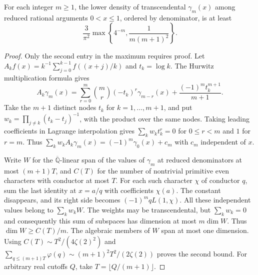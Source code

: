 \documentclass[11pt,a4paper]{article}
\theoremstyle{definition}\newtheorem{definition}[theorem]{Definition}\newtheorem{example}[theorem]{Example}
\theoremstyle{remark}\newtheorem{remark}[theorem]{Remark}
\newcommand{\Q}{\mathbb Q}\newcommand{\Z}{\mathbb Z}\newcommand{\R}{\mathbb R}\newcommand{\N}{\mathbb N}
\begin{document}
\begin{corollary}
\label{cor:farey-polynomial-order}
For each integer $m\ge1$, the lower density of transcendental
$\gamma_m(x)$ among reduced rational arguments $0<x\le1$, ordered
by denominator, is at least
\[
 \frac{3}{\pi^2}\max\left\{4^{-m},\frac{1}{m(m+1)^2}\right\}.
\]
\end{corollary}
\begin{proof}
Only the second entry in the maximum requires proof. Let
$A_k f(x)=k^{-1}\sum_{j=0}^{k-1}f((x+j)/k)$ and $t_k=\log k$.
The Hurwitz multiplication formula gives
\[
 A_k\gamma_m(x)=\sum_{r=0}^m\binom mr(-t_k)^r
                 \gamma_{m-r}(x)+\frac{(-1)^m t_k^{m+1}}{m+1}.
\]
Take the $m+1$ distinct nodes $t_k$ for $k=1,\dots,m+1$, and put
$w_k=\prod_{j\ne k}(t_k-t_j)^{-1}$, with the product over the same
nodes. Taking leading coefficients in Lagrange interpolation gives
$\sum_k w_k t_k^r=0$ for $0\le r<m$ and $1$ for $r=m$. Thus
$\sum_k w_k A_k\gamma_m(x)=(-1)^m\gamma_0(x)+c_m$ with $c_m$
independent of $x$.

Write $W$ for the $\overline{\Q}$-linear span of the values of
$\gamma_m$ at reduced denominators at most $(m+1)T$, and $C(T)$
for the number of nontrivial primitive even characters with conductor
at most $T$. For each such character $\chi$ of conductor $q$, sum
the last identity at $x=a/q$ with coefficients $\chi(a)$. The
constant disappears, and its right side becomes $(-1)^m qL(1,\chi)$.
All these independent values belong to $\sum_k w_kW$. The weights
may be transcendental, but $\sum_k w_k=0$ and consequently this sum
of subspaces has dimension at most $m\dim W$. Thus
$\dim W\ge C(T)/m$. The algebraic members of $W$ span at most one
dimension. Using $C(T)\sim T^2/(4\zeta(2)^2)$ and
$\sum_{q\le (m+1)T}\varphi(q)\sim(m+1)^2T^2/(2\zeta(2))$
proves the second bound. For arbitrary real cutoffs $Q$, take
$T=\lfloor Q/(m+1)\rfloor$.
\end{proof}
\end{document}
